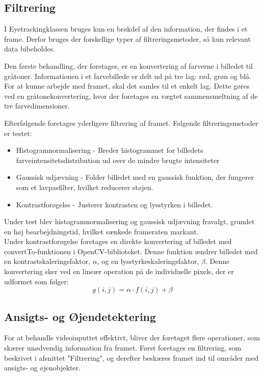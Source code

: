    
\subsection{Filtrering}
I Eyetrackingklassen bruges kun en brøkdel af den information, der findes i et frame. 
Derfor bruges der forskellige typer af filtreringsmetoder, så kun relevant data bibeholdes.

Den første behandling, der foretages, er en konvertering af farverne i billedet til gråtoner. 
Informationen i et farvebillede er delt ud på tre lag: rød, grøn og blå. 
For at kunne arbejde med framet, skal det samles til et enkelt lag. 
Dette gøres ved en gråtonekonvertering, hvor der foretages en vægtet sammensmeltning af de tre farvedimensioner.

Efterfølgende foretages yderligere filtrering af framet. 
Følgende filtreringsmetoder er testet:

\begin{itemize}
	\item Histogramnormalisering -	Breder histogrammet for billedets farveintensitetsdistribution ud over de mindre brugte intensiteter 
	\item Gaussisk udjævning - Folder billedet med en gaussisk funktion, der fungerer som et lavpasfilter, hvilket reducerer støjen.
	\item Kontrastforøgelse - Justerer kontrasten og lysstyrken i billedet.
\end{itemize}

Under test blev histogramnormalisering og gaussisk udjævning fravalgt, grundet en  høj bearbejdningstid, hvilket sænkede frameraten markant.\\
Under kontrastforøgelse foretages en direkte konvertering af billedet med convertTo-funktionen i OpenCV-biblioteket. 
Denne funktion ændrer billedet med en kontrastskaleringsfaktor, $ \alpha $, og en lysstyrkeskaleringsfaktor, $ \beta $.
Denne konvertering sker ved en lineær operation på de individuelle pixels, der er udformet som følger: 
\begin{equation}
	g(i,j) = \alpha \cdot f(i,j) + \beta
\end{equation}   
    
    
\subsection{Ansigts- og Øjendetektering}
For at behandle videoinputtet effektivt, bliver der foretaget flere operationer, som skærer unødvendig information fra framet. 
Først foretages en filtrering, som beskrivet i afsnittet "Filtrering", og derefter beskæres framet ind til områder med ansigts- og øjenobjekter.

